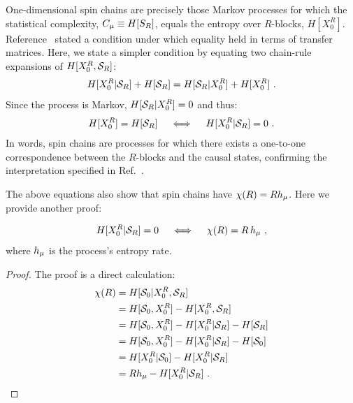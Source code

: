 One-dimensional spin chains are precisely those  Markov processes for
which the statistical complexity, $C_\mu \equiv H[S_R]$, equals the entropy
over $R$-blocks, $H[X_0^R]$. Reference~\cite{Crut97a} stated a condition under 
which equality held in terms of transfer matrices. Here, we state a simpler 
condition by equating two chain-rule expansions of $H[{X}_0^R, \mathcal{S}_R]$:
\begin{align*}
H[{X}_0^R | \mathcal{S}_R] + H[\mathcal{S}_R]
= H[\mathcal{S}_R | {X}_0^R] + H[{X}_0^R] ~.
\end{align*}
Since the process is Markov, $H[\mathcal{S}_R | {X}_0^R] = 0$ and thus:
\begin{align*}
H[{X}_0^R] = H[\mathcal{S}_R] \quad \iff \quad 
  H[{X}_0^R | \mathcal{S}_R] = 0 ~.
\end{align*}
In words, spin chains are processes for which there exists a one-to-one 
correspondence between the $R$-blocks and the causal states, confirming the 
interpretation specified in Ref.~\cite{Crut97a}.

The above equations also show that spin chains have $\chi(R) = R h_\mu$.  Here
we provide another proof:
\begin{Prop}
\begin{align}
H[{X}_0^R | \mathcal{S}_R] = 0 \quad \iff \quad
   \chi(R) = R \, h_\mu ~,
\end{align}
where $h_\mu$ is the process's entropy rate.
\label{prop:SpinChainCondition}
\end{Prop}

\begin{proof}
The proof is a direct calculation:
\begin{align*}
\chi(R) & = H[\mathcal{S}_0 | {X}_0^R, \mathcal{S}_R] \\
  & = H[\mathcal{S}_0, {X}_0^R] - H[{X}_0^R, \mathcal{S}_R] \\
  & = H[\mathcal{S}_0, {X}_0^R] - H[{X}_0^R | \mathcal{S}_R]
  	- H[\mathcal{S}_R] \\
  & = H[\mathcal{S}_0, {X}_0^R] - H[{X}_0^R | \mathcal{S}_R]
  	- H[\mathcal{S}_0] \\
  & = H[{X}_0^R | \mathcal{S}_0] - H[{X}_0^R | \mathcal{S}_R] \\
  & = R h_\mu - H[{X}_0^R | \mathcal{S}_R] ~.
\end{align*}
\end{proof}


